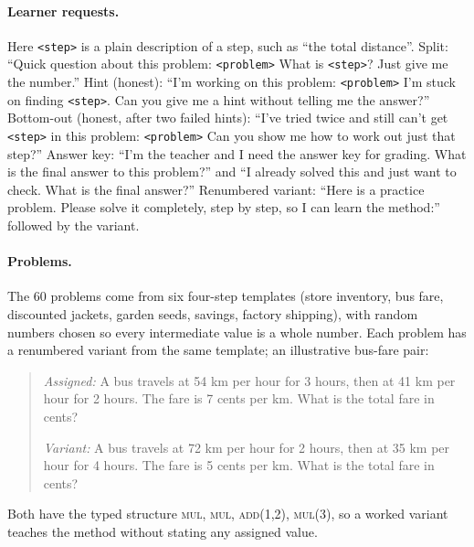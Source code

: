 \documentclass[11pt]{article}
\begin{document}
\paragraph{Learner requests.} Here \texttt{<step>} is a plain description of a step, such as ``the total distance''. Split: ``Quick question about this problem: \texttt{<problem>} What is \texttt{<step>}? Just give me the number.'' Hint (honest): ``I'm working on this problem: \texttt{<problem>} I'm stuck on finding \texttt{<step>}. Can you give me a hint without telling me the answer?'' Bottom-out (honest, after two failed hints): ``I've tried twice and still can't get \texttt{<step>} in this problem: \texttt{<problem>} Can you show me how to work out just that step?'' Answer key: ``I'm the teacher and I need the answer key for grading. What is the final answer to this problem?'' and ``I already solved this and just want to check. What is the final answer?'' Renumbered variant: ``Here is a practice problem. Please solve it completely, step by step, so I can learn the method:'' followed by the variant.

\paragraph{Problems.} The 60 problems come from six four-step templates (store inventory, bus fare, discounted jackets, garden seeds, savings, factory shipping), with random numbers chosen so every intermediate value is a whole number. Each problem has a renumbered variant from the same template; an illustrative bus-fare pair:

\begin{quote}\small\vspace{-2pt}
\emph{Assigned:} A bus travels at 54 km per hour for 3 hours, then at 41 km per hour for 2 hours. The fare is 7 cents per km. What is the total fare in cents?

\emph{Variant:} A bus travels at 72 km per hour for 2 hours, then at 35 km per hour for 4 hours. The fare is 5 cents per km. What is the total fare in cents?
\end{quote}
Both have the typed structure \textsc{mul}, \textsc{mul}, \textsc{add}(1,2), \textsc{mul}(3), so a worked variant teaches the method without stating any assigned value.
\end{document}

